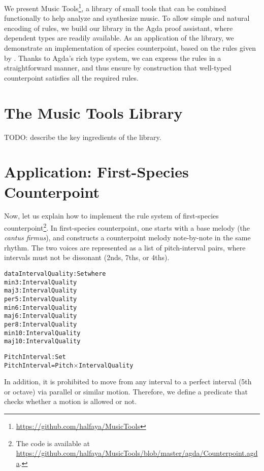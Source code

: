 \documentclass[sigplan,10pt,screen]{acmart}
\begin{document}
We present Music Tools\footnote{\url{https://github.com/halfaya/MusicTools}}, a library of small tools that can be combined functionally to 
help analyze and synthesize music.
To allow simple and natural encoding of rules, we build our 
library in the Agda \citep{norellphd} proof assistant, where
dependent types are readily available.
As an application of the library, we demonstrate an
implementation  of  species counterpoint, based on the rules 
given by \citet{fux1965study}.
Thanks to Agda's rich type system, we can express 
the rules in a straightforward manner, and thus ensure by 
construction that well-typed counterpoint satisfies all the 
required rules.


\section{The Music Tools Library}

TODO: describe the key ingredients of the library.


\section{Application: First-Species Counterpoint}

Now, let us explain how to implement the rule system of 
first-species counterpoint\footnote{The code is available at \\
\url{https://github.com/halfaya/MusicTools/blob/master/agda/Counterpoint.agda}.}.
In first-species counterpoint, one starts with a base melody 
(the \emph{cantus firmus}), and constructs a counterpoint 
melody note-by-note in the same rhythm.
The two voices are represented as a list of pitch-interval pairs,
where intervals must not be dissonant (2nds, 7ths, or 4ths).

\begin{alltt}
data IntervalQuality : Set where
  min3  : IntervalQuality
  maj3  : IntervalQuality
  per5  : IntervalQuality
  min6  : IntervalQuality
  maj6  : IntervalQuality
  per8  : IntervalQuality
  min10 : IntervalQuality
  maj10 : IntervalQuality

PitchInterval : Set
PitchInterval = Pitch \(\times\) IntervalQuality
\end{alltt}

In addition, it is prohibited to move from any interval to
a perfect interval (5th or octave) via parallel or similar motion.
Therefore, we define a predicate that checks whether a motion 
is allowed or not.
\end{document}
